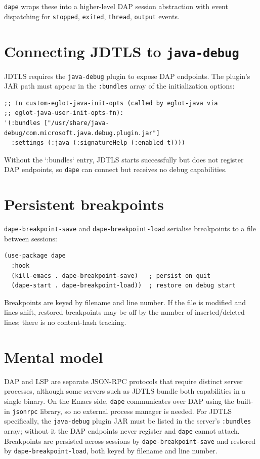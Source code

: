 \texttt{dape} wraps these into a higher-level DAP session abstraction with event dispatching for \texttt{stopped}, \texttt{exited}, \texttt{thread}, \texttt{output} events.

\section{Connecting JDTLS to \texttt{java-debug}}\label{connecting-jdtls-to-java-debug}

JDTLS requires the \texttt{java-debug} plugin to expose DAP endpoints. The plugin's JAR path must appear in the \texttt{:bundles} array of the initialization options:

\begin{verbatim}
;; In custom-eglot-java-init-opts (called by eglot-java via
;; eglot-java-user-init-opts-fn):
'(:bundles ["/usr/share/java-debug/com.microsoft.java.debug.plugin.jar"]
  :settings (:java (:signatureHelp (:enabled t))))
\end{verbatim}

Without the `:bundles` entry, JDTLS starts successfully but does not register DAP endpoints, so \texttt{dape} can connect but receives no debug capabilities.

\section{Persistent breakpoints}\label{persistent-breakpoints}

\texttt{dape-breakpoint-save} and \texttt{dape-breakpoint-load} serialise breakpoints to a file between sessions:

\begin{verbatim}
(use-package dape
  :hook
  (kill-emacs . dape-breakpoint-save)   ; persist on quit
  (dape-start . dape-breakpoint-load))  ; restore on debug start
\end{verbatim}

Breakpoints are keyed by filename and line number. If the file is modified and lines shift, restored breakpoints may be off by the number of inserted/deleted lines; there is no content-hash tracking.

\section{Mental model}
DAP and LSP are separate JSON-RPC protocols that require distinct server
processes, although some servers such as JDTLS bundle both capabilities in a
single binary.  On the Emacs side, \texttt{dape} communicates over DAP using
the built-in \texttt{jsonrpc} library, so no external process manager is
needed.  For JDTLS specifically, the \texttt{java-debug} plugin JAR must be
listed in the server's \texttt{:bundles} array; without it the DAP endpoints
never register and \texttt{dape} cannot attach.  Breakpoints are persisted
across sessions by \texttt{dape-breakpoint-save} and restored by
\texttt{dape-breakpoint-load}, both keyed by filename and line number.
